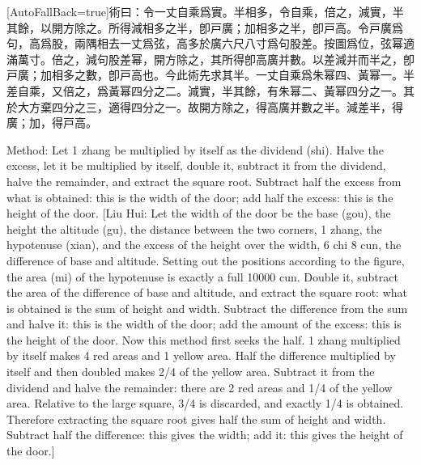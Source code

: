 \documentclass[11pt]{article}
\newcommand{\zhsmall}{\footnotesize\color{black!70}}
\newcommand{\unitlabel}[1]{\marginpar{\raggedleft\tiny\color{gray}#1}}
\newenvironment{unitzh}{\par\CJKfontspec{Noto Serif CJK SC}[AutoFallBack=true]\large\linespread{1.25}\selectfont}{\par}
\newenvironment{uniten}{\par\small\color{black!85}}{\par\medskip}
\begin{document}
\begin{unitzh}\unitlabel{jiuzhang-039.2}術曰：令一丈自乘爲實。半相多，令自乘，倍之，減實，半其餘，以開方除之。所得減相多之半，卽戸廣；加相多之半，卽戸高。{\zhsmall 令戸廣爲句，高爲股，兩隅相去一丈爲弦，高多於廣六尺八寸爲句股差。按圖爲位，弦幂適滿萬寸。倍之，減句股差幂，開方除之，其所得卽高廣并數。以差減并而半之，卽戸廣；加相多之數，卽戸高也。今此術先求其半。一丈自乘爲朱幂四、黃幂一。半差自乘，又倍之，爲黃幂四分之二。減實，半其餘，有朱幂二、黃幂四分之一。其於大方棄四分之三，適得四分之一。故開方除之，得高廣并數之半。減差半，得廣；加，得戸高。}\end{unitzh}
\begin{uniten}Method: Let 1 zhang be multiplied by itself as the dividend (shi). Halve the excess, let it be multiplied by itself, double it, subtract it from the dividend, halve the remainder, and extract the square root. Subtract half the excess from what is obtained: this is the width of the door; add half the excess: this is the height of the door. [Liu Hui: Let the width of the door be the base (gou), the height the altitude (gu), the distance between the two corners, 1 zhang, the hypotenuse (xian), and the excess of the height over the width, 6 chi 8 cun, the difference of base and altitude. Setting out the positions according to the figure, the area (mi) of the hypotenuse is exactly a full 10000 cun. Double it, subtract the area of the difference of base and altitude, and extract the square root: what is obtained is the sum of height and width. Subtract the difference from the sum and halve it: this is the width of the door; add the amount of the excess: this is the height of the door. Now this method first seeks the half. 1 zhang multiplied by itself makes 4 red areas and 1 yellow area. Half the difference multiplied by itself and then doubled makes 2/4 of the yellow area. Subtract it from the dividend and halve the remainder: there are 2 red areas and 1/4 of the yellow area. Relative to the large square, 3/4 is discarded, and exactly 1/4 is obtained. Therefore extracting the square root gives half the sum of height and width. Subtract half the difference: this gives the width; add it: this gives the height of the door.]\end{uniten}
\end{document}
